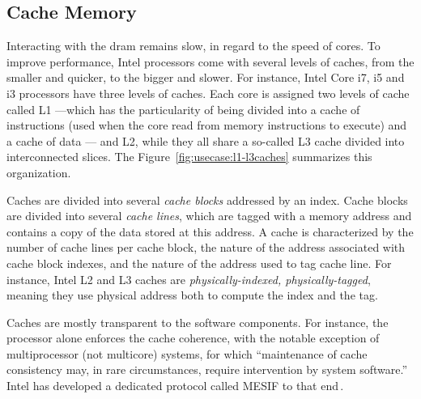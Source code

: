\subsection{Cache Memory}
\label{subsec:usecase:cachemem}
%
Interacting with the \ac{dram} remains slow, in regard to the speed of cores.
%
To improve performance, Intel processors come with several levels of caches,
from the smaller and quicker, to the bigger and slower.
%
For instance, Intel Core i7, i5 and i3 processors have three levels of caches.
%
Each core is assigned two levels of cache called L1 ---which has the
particularity of being divided into a cache of instructions (used when the core
read from memory instructions to execute) and a cache of data --- and L2, while
they all share a so-called L3 cache divided into interconnected slices.
%
The Figure~\ref{fig:usecase:l1-l3caches} summarizes this organization.

Caches are divided into several \emph{cache blocks} addressed by an index.
%
Cache blocks are divided into several \emph{cache lines}, which are tagged with
a memory address and contains a copy of the data stored at this address.
%
A cache is characterized by the number of cache lines per cache block, the
nature of the address associated with cache block indexes, and the nature of the
address used to tag cache line.
%
For instance, Intel L2 and L3 caches are \emph{physically-indexed,
  physically-tagged}, meaning they use physical address both to compute the
index and the tag.

Caches are mostly transparent to the software components.
%
For instance, the processor alone enforces the cache coherence, with the notable
exception of multiprocessor (not multicore) systems, for which ``maintenance of
cache consistency may, in rare circumstances, require intervention by system
software.''
%
Intel has developed a dedicated protocol called MESIF to that
end\,\cite{thomadakis2011nehalem}.

